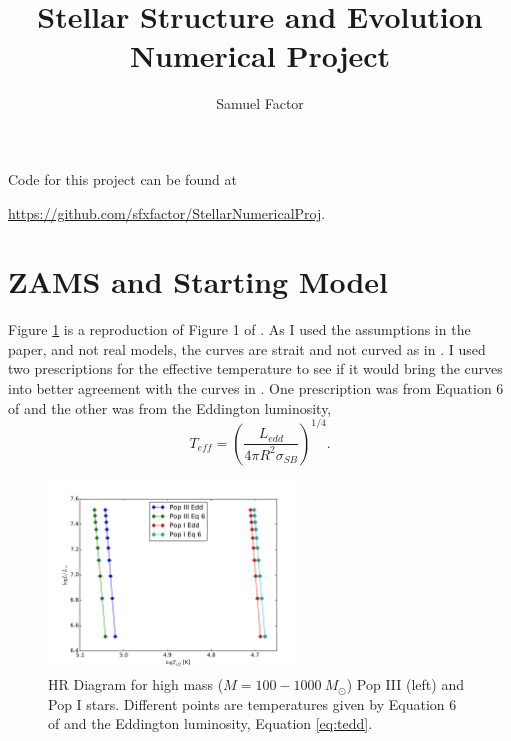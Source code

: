 \documentclass[12pt]{paper}
\title{Stellar Structure and Evolution Numerical Project}
\author{Samuel Factor}
\begin{document}
\maketitle

Code for this project can be found at 

\url{https://github.com/sfxfactor/StellarNumericalProj}.
\section{ZAMS and Starting Model}
Figure \ref{fig:fig1} is a reproduction of Figure 1 of \citet{BKL}. As I used the assumptions in the paper, and not real models, the curves are strait and not curved as in \citet{BKL}. I used two prescriptions for the effective temperature to see if it would bring the curves into better agreement with the curves in \citet{BKL}. One prescription was from Equation 6 of \citet{BKL} and the other was from the Eddington luminosity,
\begin{equation}\label{eq:tedd}
T_{eff}=\left(\frac{L_{edd}}{4\pi R^2 \sigma_{SB}}\right)^{1/4}.
\end{equation}


\begin{figure}
\begin{center}
    \includegraphics[width=0.6\textwidth]{fig1.pdf}
    \caption{HR Diagram for high mass ($M=100-1000~M_\odot$) Pop III (left) and Pop I stars. Different points are temperatures given by Equation 6 of \citet{BKL} and the Eddington luminosity, Equation \ref{eq:tedd}. }
    \label{fig:fig1}
\end{center}
\end{figure}
\end{document}
